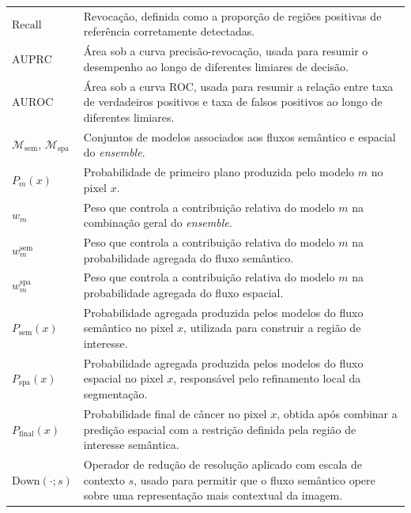 \begin{longtable}{p{3.0cm}p{12.0cm}}
  $\mathrm{Recall}$ &
  Revocação, definida como a proporção de regiões positivas de referência
  corretamente detectadas.\\

  $\mathrm{AUPRC}$ &
  Área sob a curva precisão-revocação, usada para resumir o desempenho ao longo
  de diferentes limiares de decisão.\\

  $\mathrm{AUROC}$ &
  Área sob a curva ROC, usada para resumir a relação entre taxa de verdadeiros
  positivos e taxa de falsos positivos ao longo de diferentes limiares.\\

  $\mathcal{M}_{\mathrm{sem}}$, $\mathcal{M}_{\mathrm{spa}}$ &
  Conjuntos de modelos associados aos fluxos semântico e espacial do
  \textit{ensemble}.\\

  $P_m(x)$ &
  Probabilidade de primeiro plano produzida pelo modelo $m$ no pixel $x$.\\

  $w_m$ &
  Peso que controla a contribuição relativa do modelo $m$ na combinação geral do
  \textit{ensemble}.\\

  $w_m^{\mathrm{sem}}$ &
  Peso que controla a contribuição relativa do modelo $m$ na probabilidade
  agregada do fluxo semântico.\\

  $w_m^{\mathrm{spa}}$ &
  Peso que controla a contribuição relativa do modelo $m$ na probabilidade
  agregada do fluxo espacial.\\

  $P_{\mathrm{sem}}(x)$ &
  Probabilidade agregada produzida pelos modelos do fluxo semântico no pixel
  $x$, utilizada para construir a região de interesse.\\

  $P_{\mathrm{spa}}(x)$ &
  Probabilidade agregada produzida pelos modelos do fluxo espacial no pixel
  $x$, responsável pelo refinamento local da segmentação.\\

  $P_{\mathrm{final}}(x)$ &
  Probabilidade final de câncer no pixel $x$, obtida após combinar a predição
  espacial com a restrição definida pela região de interesse semântica.\\

  $\mathrm{Down}(\cdot;s)$ &
  Operador de redução de resolução aplicado com escala de contexto $s$, usado
  para permitir que o fluxo semântico opere sobre uma representação mais
  contextual da imagem.\\


\end{longtable}
